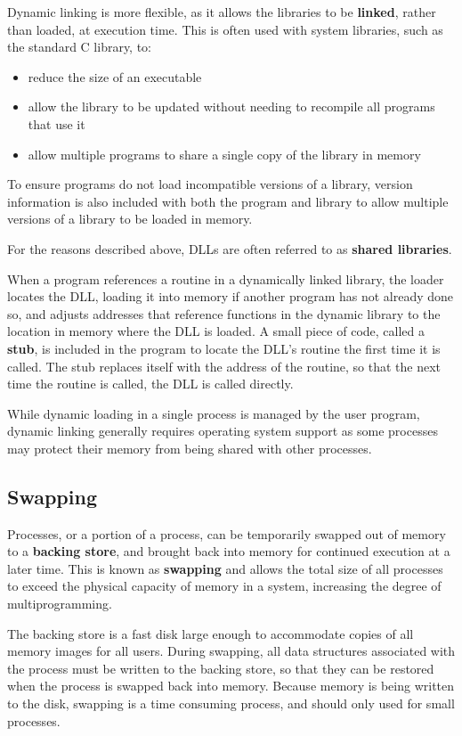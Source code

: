 \documentclass{article}
\begin{document}
Dynamic linking is more flexible, as it allows the libraries to be
\textbf{linked}, rather than loaded, at execution time. This is often
used with system libraries, such as the standard C library, to:
\begin{itemize}
    \item reduce the size of an executable
    \item allow the library to be updated without needing to recompile
          all programs that use it
    \item allow multiple programs to share a single copy of the library
          in memory
\end{itemize}
To ensure programs do not load incompatible versions of a library,
version information is also included with both the program and library
to allow multiple versions of a library to be loaded in memory.

For the reasons described above, DLLs are often referred to as
\textbf{shared libraries}.

When a program references a routine in a dynamically linked library,
the loader locates the DLL, loading it into memory if another program
has not already done so, and adjusts addresses that reference functions
in the dynamic library to the location in memory where the DLL is
loaded. A small piece of code, called a \textbf{stub}, is included in
the program to locate the DLL's routine the first time it is called.
The stub replaces itself with the address of the routine, so that the
next time the routine is called, the DLL is called directly.

While dynamic loading in a single process is managed by the user
program, dynamic linking generally requires operating system support as
some processes may protect their memory from being shared with other
processes.
\subsection{Swapping}
Processes, or a portion of a process, can be temporarily swapped out of
memory to a \textbf{backing store}, and brought back into memory for
continued execution at a later time. This is known as \textbf{swapping}
and allows the total size of all processes to exceed the physical
capacity of memory in a system, increasing the degree of
multiprogramming.

The backing store is a fast disk large enough to accommodate copies of
all memory images for all users. During swapping, all data structures
associated with the process must be written to the backing store, so
that they can be restored when the process is swapped back into memory.
Because memory is being written to the disk, swapping is a time
consuming process, and should only used for small processes.
\end{document}
